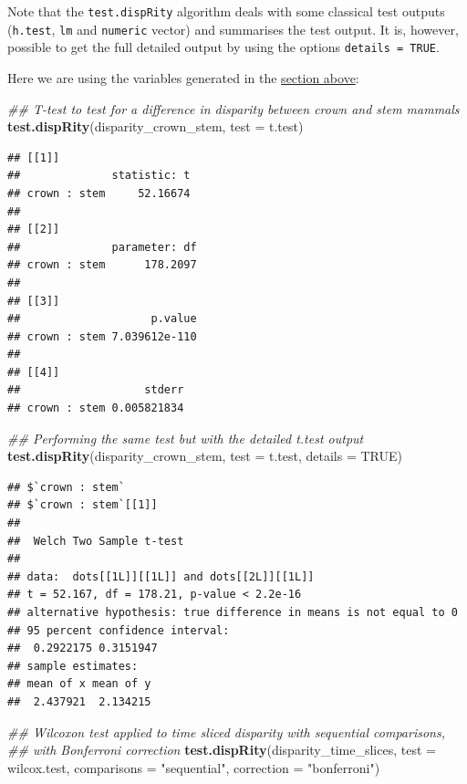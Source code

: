\documentclass[]{book}
\newenvironment{Shaded}{\begin{snugshade}}{\end{snugshade}}
\newcommand{\CommentTok}[1]{\textcolor[rgb]{0.56,0.35,0.01}{\textit{#1}}}
\newcommand{\DataTypeTok}[1]{\textcolor[rgb]{0.13,0.29,0.53}{#1}}
\newcommand{\KeywordTok}[1]{\textcolor[rgb]{0.13,0.29,0.53}{\textbf{#1}}}
\newcommand{\NormalTok}[1]{#1}
\newcommand{\OtherTok}[1]{\textcolor[rgb]{0.56,0.35,0.01}{#1}}
\newcommand{\StringTok}[1]{\textcolor[rgb]{0.31,0.60,0.02}{#1}}
\begin{document}
Note that the \texttt{test.dispRity} algorithm deals with some classical test outputs (\texttt{h.test}, \texttt{lm} and \texttt{numeric} vector) and summarises the test output.
It is, however, possible to get the full detailed output by using the options \texttt{details\ =\ TRUE}.

Here we are using the variables generated in the \protect\hyperlink{summarising-dispRity-data-plots}{section above}:

\begin{Shaded}
\begin{Highlighting}[]
\CommentTok{## T-test to test for a difference in disparity between crown and stem mammals}
\KeywordTok{test.dispRity}\NormalTok{(disparity_crown_stem, }\DataTypeTok{test =}\NormalTok{ t.test)}
\end{Highlighting}
\end{Shaded}

\begin{verbatim}
## [[1]]
##              statistic: t
## crown : stem     52.16674
## 
## [[2]]
##              parameter: df
## crown : stem      178.2097
## 
## [[3]]
##                    p.value
## crown : stem 7.039612e-110
## 
## [[4]]
##                   stderr
## crown : stem 0.005821834
\end{verbatim}

\begin{Shaded}
\begin{Highlighting}[]
\CommentTok{## Performing the same test but with the detailed t.test output}
\KeywordTok{test.dispRity}\NormalTok{(disparity_crown_stem, }\DataTypeTok{test =}\NormalTok{ t.test, }\DataTypeTok{details =} \OtherTok{TRUE}\NormalTok{)}
\end{Highlighting}
\end{Shaded}

\begin{verbatim}
## $`crown : stem`
## $`crown : stem`[[1]]
## 
##  Welch Two Sample t-test
## 
## data:  dots[[1L]][[1L]] and dots[[2L]][[1L]]
## t = 52.167, df = 178.21, p-value < 2.2e-16
## alternative hypothesis: true difference in means is not equal to 0
## 95 percent confidence interval:
##  0.2922175 0.3151947
## sample estimates:
## mean of x mean of y 
##  2.437921  2.134215
\end{verbatim}

\begin{Shaded}
\begin{Highlighting}[]
\CommentTok{## Wilcoxon test applied to time sliced disparity with sequential comparisons,}
\CommentTok{## with Bonferroni correction}
\KeywordTok{test.dispRity}\NormalTok{(disparity_time_slices, }\DataTypeTok{test =}\NormalTok{ wilcox.test,}
              \DataTypeTok{comparisons =} \StringTok{"sequential"}\NormalTok{, }\DataTypeTok{correction =} \StringTok{"bonferroni"}\NormalTok{)}
\end{Highlighting}
\end{Shaded}
\end{document}
